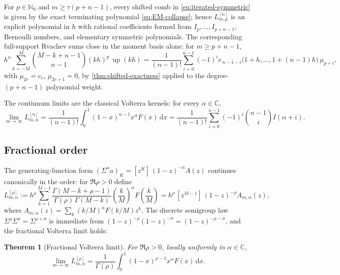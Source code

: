 \documentclass[11pt,oneside]{article}
\numberwithin{equation}{section}
\newtheorem{theorem}{Theorem}[section]
\theoremstyle{definition}
\theoremstyle{remark}
\newcommand{\C}{\mathbb C}
\newcommand{\N}{\mathbb N}
\newcommand{\dd}{\,\mathrm d}
\newcommand{\Up}{\operatorname{up}}
\begin{document}
\begin{corollary}
\label{cor:iterated-natural}
For $p\in\N_0$ and $m\ge\tau(p+n-1)$, every shifted comb in
\eqref{eq:iterated-symmetric} is given by the exact terminating
polynomial \eqref{eq:EM-collapse}; hence $L^{[n]}_{m,p}$ is an
explicit polynomial in $h$ with rational coefficients formed from
$I_p,\dots,I_{p+n-1}$, Bernoulli numbers, and elementary symmetric
polynomials.  The corresponding full-support Rvachev sums close in
the moment basis alone: for $m\ge p+n-1$,
\begin{equation}
 h^{n}\sum_{k=-M}^{M}\binom{M-k+n-1}{n-1}(kh)^{p}\,\Up(kh)
 =\frac{1}{(n-1)!}
 \sum_{i=0}^{n-1}(-1)^{i}
 e_{\,n-1-i}\bigl(1{+}h,\dots,1{+}(n{-}1)h\bigr)\,
 \mu_{p+i},
 \label{eq:iter-up-moments}
\end{equation}
with $\mu_{2r}=c_r$, $\mu_{2r+1}=0$, by
\cref{thm:shifted-exactness} applied to the degree-$(p{+}n{-}1)$
polynomial weight.
\end{corollary}

The continuum limits are the classical Volterra kernels: for every
$\alpha\in\C$,
\begin{equation}
 \lim_{m\to\infty}L^{[n]}_{m,\alpha}
 =\frac{1}{(n-1)!}\int_0^1(1-x)^{n-1}x^{\alpha}F(x)\dd x
 =\frac{1}{(n-1)!}
 \sum_{i=0}^{n-1}(-1)^{i}\binom{n-1}{i}I(\alpha+i).
 \label{eq:iterated-limit}
\end{equation}

\subsection{Fractional order}

The generating-function form
$(\Sigma^{n}a)_{K}=[z^{K}]\,(1-z)^{-n}A(z)$ continues canonically in
the order: for $\Re\rho>0$ define
\begin{equation}
 L^{[\rho]}_{m,\alpha}
 :=h^{\rho}\sum_{k=1}^{M-1}
 \frac{\Gamma(M-k+\rho-1)}{\Gamma(\rho)\,\Gamma(M-k)}
 \left(\frac kM\right)^{\alpha}F\!\left(\frac kM\right)
 =h^{\rho}\,[z^{M-1}]\,(1-z)^{-\rho}A_{m,\alpha}(z),
 \label{eq:fractional-sum}
\end{equation}
where $A_{m,\alpha}(z)=\sum_k(k/M)^{\alpha}F(k/M)z^{k}$.  The discrete
semigroup law $\Sigma^{\rho}\Sigma^{\sigma}=\Sigma^{\rho+\sigma}$ is
immediate from $(1-z)^{-\rho}(1-z)^{-\sigma}=(1-z)^{-\rho-\sigma}$,
and the fractional Volterra limit holds:

\begin{theorem}[Fractional Volterra limit]
\label{thm:fractional-limit}
For $\Re\rho>0$, locally uniformly in $\alpha\in\C$,
\begin{equation}
 \lim_{m\to\infty}L^{[\rho]}_{m,\alpha}
 =\frac{1}{\Gamma(\rho)}
 \int_0^1(1-x)^{\rho-1}x^{\alpha}F(x)\dd x.
 \label{eq:fractional-limit}
\end{equation}
\end{theorem}
\end{document}
